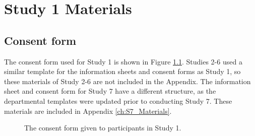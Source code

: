 \chapter{Study 1 Materials}
\section{Consent form}\label{ch:consentform}
The consent form used for Study 1 is shown in Figure \ref{fig:consentform}. Studies 2-6 used a similar template for the information sheets and consent forms as Study 1, so these materials of Study 2-6 are not included in the Appendix. The information sheet and consent form for Study 7 have a different structure, as the departmental templates were updated prior to conducting Study 7. These materials are included in Appendix \ref{ch:S7_Materials}.

\begin{figure}[htp] 
\caption[Study 1 consent form]{The consent form given to participants in Study 1.}
\label{fig:consentform}
\end{figure} 

